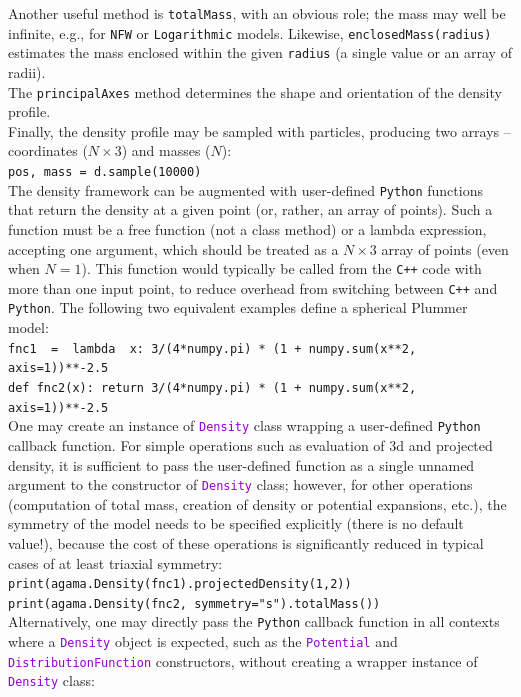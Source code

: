 \documentclass[12pt]{article}
\newcommand{\Cpp}  {\texttt{C++}\xspace}
\newcommand{\Python}{\texttt{Python}\xspace}
\newcommand{\ttt}[1]{\textcolor{darkviolet}{\texttt{#1}}}
\newcommand{\ppp}[1]{\textcolor{darkolive} {\texttt{#1}}}
\begin{document}
Another useful method is \texttt{totalMass}, with an obvious role; the mass may well be infinite, e.g., for \ppp{NFW} or \ppp{Logarithmic} models. Likewise, \texttt{enclosedMass(radius)} estimates the mass enclosed within the given \texttt{radius} (a single value or an array of radii).\\[2mm]
The \texttt{principalAxes} method determines the shape and orientation of the density profile.\\[2mm]
Finally, the density profile may be sampled with particles, producing two arrays -- coordinates ($N\times3$) and masses ($N$): \\
\texttt{pos, mass = d.sample(10000)}\\[2mm]
The density framework can be augmented with user-defined \Python functions that return the density at a given point (or, rather, an array of points). Such a function must be a free function (not a class method) or a lambda expression, accepting one argument, which should be treated as a $N\times3$ array of points (even when $N=1$). This function would typically be called from the \Cpp code with more than one input point, to reduce overhead from switching between \Cpp and \Python. The following two equivalent examples define a spherical Plummer model:\\
\texttt{fnc1~~=~~lambda~~x:  3/(4*numpy.pi) * (1 + numpy.sum(x**2, axis=1))**-2.5}\\
\texttt{def fnc2(x):  return 3/(4*numpy.pi) * (1 + numpy.sum(x**2, axis=1))**-2.5}\\[2mm]
One may create an instance of \ttt{Density} class wrapping a user-defined \Python callback function. For simple operations such as evaluation of 3d and projected density, it is sufficient to pass the user-defined function as a single unnamed argument to the constructor of \ttt{Density} class; however, for other operations (computation of total mass, creation of density or potential expansions, etc.), the symmetry of the model needs to be specified explicitly (there is no default value!), because the cost of these operations is significantly reduced in typical cases of at least triaxial symmetry:\\
\texttt{print(agama.Density(fnc1).projectedDensity(1,2))}\\
\texttt{print(agama.Density(fnc2, symmetry="s").totalMass())}\\[2mm]
Alternatively, one may directly pass the \Python callback function in all contexts where a \ttt{Density} object is expected, such as the \ttt{Potential} and \ttt{DistributionFunction} constructors, without creating a wrapper instance of \ttt{Density} class: \\
\end{document}
